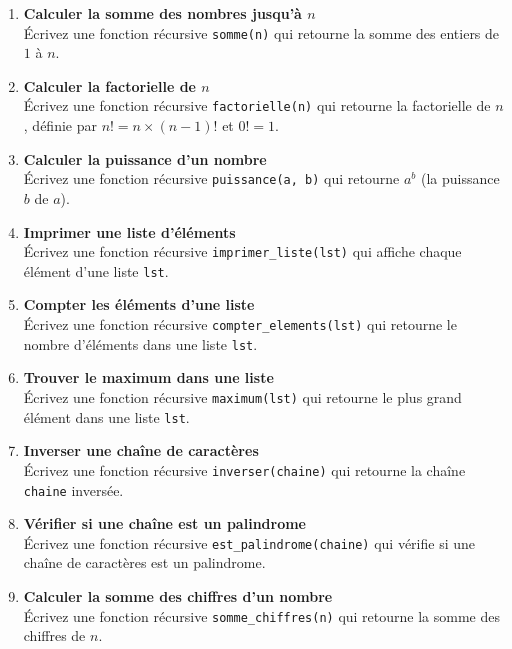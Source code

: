 

\begin{enumerate}

    \item \textbf{Calculer la somme des nombres jusqu'à $n$} \\
    Écrivez une fonction récursive \texttt{somme(n)} qui retourne la somme des entiers de $1$ à $n$.

    \item \textbf{Calculer la factorielle de $n$} \\
    Écrivez une fonction récursive \texttt{factorielle(n)} qui retourne la factorielle de $n$, définie par $n! = n \times (n-1)!$ et $0! = 1$.

    \item \textbf{Calculer la puissance d'un nombre} \\
    Écrivez une fonction récursive \texttt{puissance(a, b)} qui retourne $a^b$ (la puissance $b$ de $a$).

    \item \textbf{Imprimer une liste d'éléments} \\
    Écrivez une fonction récursive \texttt{imprimer\_liste(lst)} qui affiche chaque élément d'une liste \texttt{lst}.

    \item \textbf{Compter les éléments d'une liste} \\
    Écrivez une fonction récursive \texttt{compter\_elements(lst)} qui retourne le nombre d'éléments dans une liste \texttt{lst}.

    \item \textbf{Trouver le maximum dans une liste} \\
    Écrivez une fonction récursive \texttt{maximum(lst)} qui retourne le plus grand élément dans une liste \texttt{lst}.

    \item \textbf{Inverser une chaîne de caractères} \\
    Écrivez une fonction récursive \texttt{inverser(chaine)} qui retourne la chaîne \texttt{chaine} inversée.

    \item \textbf{Vérifier si une chaîne est un palindrome} \\
    Écrivez une fonction récursive \texttt{est\_palindrome(chaine)} qui vérifie si une chaîne de caractères est un palindrome.

    \item \textbf{Calculer la somme des chiffres d'un nombre} \\
    Écrivez une fonction récursive \texttt{somme\_chiffres(n)} qui retourne la somme des chiffres de $n$.


\end{enumerate}
